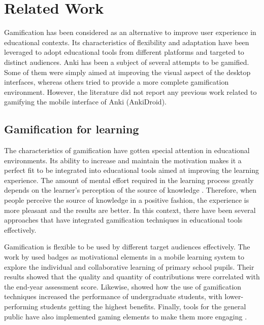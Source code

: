 
\chapter{Related Work} %

\label{rela} %


Gamification has been considered as an alternative to improve user experience in educational contexts. Its characteristics of flexibility and adaptation have been leveraged to adopt educational tools from different platforms and targeted to distinct audiences. Anki has been a subject of several attempts to be gamified. Some of them were simply aimed at improving the visual aspect of the desktop interfaces, whereas others tried to provide a more complete gamification environment. However, the literature did not report any previous work related to gamifying the mobile interface of Anki (AnkiDroid).

\section{Gamification for learning}
The characteristics of gamification have gotten special attention in educational environments. Its ability to increase and maintain the motivation makes it a perfect fit to be integrated into educational tools aimed at improving the learning experience. The amount of mental effort required in the learning process greatly depends on the learner's perception of the source of knowledge \citep{salomon1983differential}. Therefore, when people perceive the source of knowledge in a positive fashion, the experience is more pleasant and the results are better. In this context, there have been several approaches that have integrated gamification techniques in educational tools effectively.

Gamification is flexible to be used by different target audiences effectively. The work by \citep{boticki2015usage} used badges as motivational elements in a mobile learning system to explore the individual and collaborative learning of primary school pupils. Their results showed that the quality and quantity of contributions were correlated with the end-year assessment score. Likewise, \citep{slish2015gamification} showed how the use of gamification techniques increased the performance of undergraduate students, with lower-performing students getting the highest benefits. Finally, tools for the general public have also implemented gaming elements to make them more engaging \citep{morrison2014khan}.

